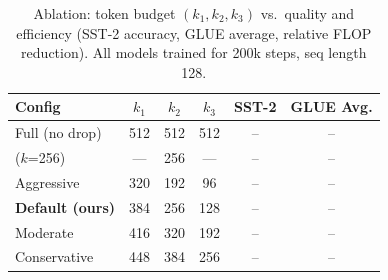
\begin{table}[t]
\centering
\small
\caption{
  Ablation: token budget $(k_1, k_2, k_3)$ vs.\ quality and efficiency
  (SST-2 accuracy, GLUE average, relative FLOP reduction).
  All models trained for 200k steps, seq length 128.
}
\label{tab:ablation_budget}
\begin{tabular}{lccccc}
\toprule
\textbf{Config}
  & $k_1$ & $k_2$ & $k_3$
  & \textbf{SST-2} & \textbf{GLUE Avg.} \\
\midrule
Full (no drop)         & 512 & 512 & 512 & -- & -- \\
\baseline{} ($k$=256)  & —   & 256 & —   & -- & -- \\
\midrule
Aggressive             & 320 & 192 & 96  & -- & -- \\
\textbf{Default (ours)}& 384 & 256 & 128 & -- & -- \\
Moderate               & 416 & 320 & 192 & -- & -- \\
Conservative           & 448 & 384 & 256 & -- & -- \\
\bottomrule
\end{tabular}
\end{table}
